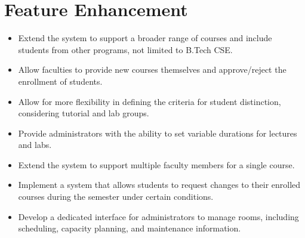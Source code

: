\documentclass[12pt,a4paper]{article}
\begin{document}
\section{Feature Enhancement}
\begin{itemize}
    \item Extend the system to support a broader range of courses and include students from other programs, not limited to B.Tech CSE.
    \item Allow faculties to provide new courses themselves and approve/reject the enrollment of students.
    \item Allow for more flexibility in defining the criteria for student distinction, considering tutorial and lab groups.
    \item Provide administrators with the ability to set variable durations for lectures and labs.
    \item Extend the system to support multiple faculty members for a single course.
    \item Implement a system that allows students to request changes to their enrolled courses during the semester under certain conditions.
    \item Develop a dedicated interface for administrators to manage rooms, including scheduling, capacity planning, and maintenance information.
\end{itemize}
        
\end{document}
